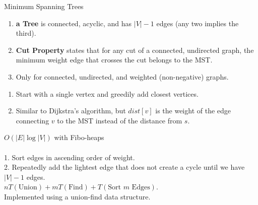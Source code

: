 \documentclass[10pt,a4paper]{article}
\begin{document}
\begin{multicols}{3}
    \begin{textbox}{Minimum Spanning Trees}
        \begin{enumerate}
            \item {\bf a Tree} is connected, acyclic, and has $|V|-1$ edges (any two implies the third).
            \item {\bf Cut Property} states that for any cut of a connected, undirected graph, the minimum weight edge that crosses the cut belongs to the MST.
            \item Only for connected, undirected, and weighted (non-negative) graphs.
        \end{enumerate}
        \begin{enumerate}
            \item Start with a single vertex and greedily add closest vertices.
            \item Similar to Dijkstra's algorithm, but $dist[v]$ is the weight of the edge connecting $v$ to the MST instead of the distance from $s$.
        \end{enumerate}
         $O(|E| \log |V|)$ with Fibo-heaps\\
        \linebreak
        \\
        1. Sort edges in ascending order of weight. \\
        2. Repeatedly add the lightest edge that does not create a cycle until we have $|V|-1$ edges.\\
        \linebreak
         $nT(\text{Union}) + mT(\text{Find}) + T(\text{Sort $m$ Edges})$.\\
         Implemented using a union-find data structure.
    \end{textbox}



\end{multicols}
\end{document}

